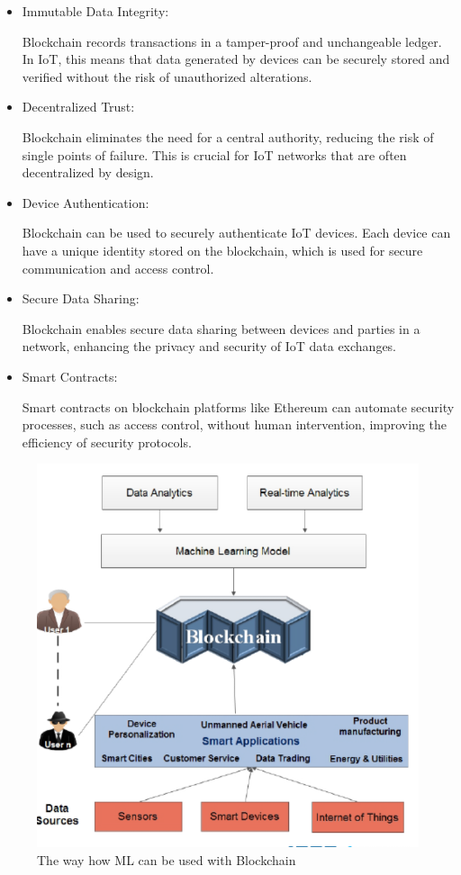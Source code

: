 \documentclass[conference]{IEEEtran}
\begin{document}
\begin{itemize}
    \item Immutable Data Integrity: 
    
    Blockchain records transactions in a tamper-proof and unchangeable ledger. In IoT, this means that data generated by devices can be securely stored and verified without the risk of unauthorized alterations.
    \item Decentralized Trust:
    
    Blockchain eliminates the need for a central authority, reducing the risk of single points of failure. This is crucial for IoT networks that are often decentralized by design.
    \item Device Authentication: 
    
    Blockchain can be used to securely authenticate IoT devices. Each device can have a unique identity stored on the blockchain, which is used for secure communication and access control.
    \item Secure Data Sharing:
    
    Blockchain enables secure data sharing between devices and parties in a network, enhancing the privacy and security of IoT data exchanges.
    \item Smart Contracts:
    
    Smart contracts on blockchain platforms like Ethereum can automate security processes, such as access control, without human intervention, improving the efficiency of security protocols.
\end{itemize}


\begin{figure}
    \centering
    \includegraphics[width=1\linewidth]{image-84.png}
    \caption{The way how ML can be used with Blockchain}
    \label{fig:enter-label}
\end{figure}
\end{document}
